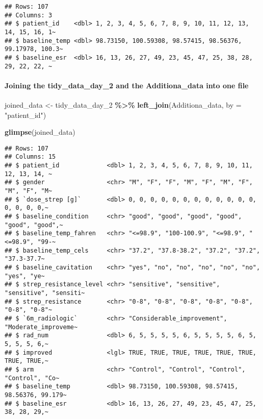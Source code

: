 \documentclass[
]{article}
\newenvironment{Shaded}{\begin{snugshade}}{\end{snugshade}}
\newcommand{\AttributeTok}[1]{\textcolor[rgb]{0.13,0.29,0.53}{#1}}
\newcommand{\FunctionTok}[1]{\textcolor[rgb]{0.13,0.29,0.53}{\textbf{#1}}}
\newcommand{\NormalTok}[1]{#1}
\newcommand{\OtherTok}[1]{\textcolor[rgb]{0.56,0.35,0.01}{#1}}
\newcommand{\SpecialCharTok}[1]{\textcolor[rgb]{0.81,0.36,0.00}{\textbf{#1}}}
\newcommand{\StringTok}[1]{\textcolor[rgb]{0.31,0.60,0.02}{#1}}
\begin{document}
\begin{verbatim}
## Rows: 107
## Columns: 3
## $ patient_id    <dbl> 1, 2, 3, 4, 5, 6, 7, 8, 9, 10, 11, 12, 13, 14, 15, 16, 1~
## $ baseline_temp <dbl> 98.73150, 100.59308, 98.57415, 98.56376, 99.17978, 100.3~
## $ baseline_esr  <dbl> 16, 13, 26, 27, 49, 23, 45, 47, 25, 38, 28, 29, 22, 22, ~
\end{verbatim}

\paragraph{Joining the tidy\_data\_day\_2 and the Additiona\_data into
one
file}\label{joining-the-tidy_data_day_2-and-the-additiona_data-into-one-file}

\begin{Shaded}
\begin{Highlighting}[]
\NormalTok{joined\_data }\OtherTok{\textless{}{-}}\NormalTok{ tidy\_data\_day\_2 }\SpecialCharTok{\%\textgreater{}\%}
  \FunctionTok{left\_join}\NormalTok{(Additiona\_data, }\AttributeTok{by =} \StringTok{"patient\_id"}\NormalTok{)}

\FunctionTok{glimpse}\NormalTok{(joined\_data)}
\end{Highlighting}
\end{Shaded}

\begin{verbatim}
## Rows: 107
## Columns: 15
## $ patient_id             <dbl> 1, 2, 3, 4, 5, 6, 7, 8, 9, 10, 11, 12, 13, 14, ~
## $ gender                 <chr> "M", "F", "F", "M", "F", "M", "F", "M", "F", "M~
## $ `dose_strep [g]`       <dbl> 0, 0, 0, 0, 0, 0, 0, 0, 0, 0, 0, 0, 0, 0, 0, 0,~
## $ baseline_condition     <chr> "good", "good", "good", "good", "good", "good",~
## $ baseline_temp_fahren   <chr> "<=98.9", "100-100.9", "<=98.9", "<=98.9", "99-~
## $ baseline_temp_cels     <chr> "37.2", "37.8-38.2", "37.2", "37.2", "37.3-37.7~
## $ baseline_cavitation    <chr> "yes", "no", "no", "no", "no", "no", "yes", "ye~
## $ strep_resistance_level <chr> "sensitive", "sensitive", "sensitive", "sensiti~
## $ strep_resistance       <chr> "0-8", "0-8", "0-8", "0-8", "0-8", "0-8", "0-8"~
## $ `6m_radiologic`        <chr> "Considerable_improvement", "Moderate_improveme~
## $ rad_num                <dbl> 6, 5, 5, 5, 5, 6, 5, 5, 5, 5, 6, 5, 5, 5, 5, 6,~
## $ improved               <lgl> TRUE, TRUE, TRUE, TRUE, TRUE, TRUE, TRUE, TRUE,~
## $ arm                    <chr> "Control", "Control", "Control", "Control", "Co~
## $ baseline_temp          <dbl> 98.73150, 100.59308, 98.57415, 98.56376, 99.179~
## $ baseline_esr           <dbl> 16, 13, 26, 27, 49, 23, 45, 47, 25, 38, 28, 29,~
\end{verbatim}
\end{document}
